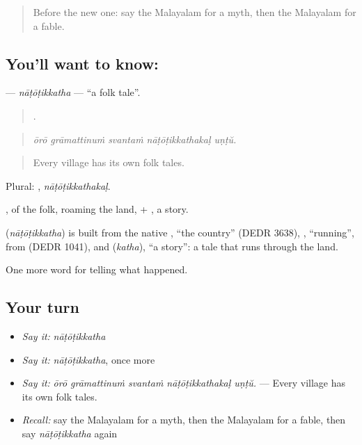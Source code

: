 \label{lesson:ML-C402-natotikkatha}



\begin{quote}
Before the new one: say the Malayalam for a myth, then the Malayalam for a fable.
\end{quote}

\subsection*{You'll want to know: }
\textbf{} — \emph{nāṭōṭikkatha} — \textquotedblleft{}a folk tale\textquotedblright{}.

\begin{quote}
    .
\end{quote}

\begin{quote}
\emph{ōrō grāmattinuṁ svantaṁ nāṭōṭikkathakaḷ uṇṭŭ.}
\end{quote}

\begin{quote}
Every village has its own folk tales.
\end{quote}

Plural: , \emph{nāṭōṭikkathakaḷ}.

, of the folk, roaming the land, + , a story.

\begin{cousinweb}
\textbf{} (\emph{nāṭōṭikkatha}) is built from the native , \textquotedblleft{}the country\textquotedblright{} (DEDR 3638), , \textquotedblleft{}running\textquotedblright{}, from  (DEDR 1041), and  (\emph{katha}), \textquotedblleft{}a story\textquotedblright{}: a tale that runs through the land.
\end{cousinweb}

\begin{grammarlens}[title={What you've built}]
One more word for telling what happened.
\end{grammarlens}

\subsection*{Your turn}
\begin{itemize}
\raggedright
  \item \emph{Say it:} \emph{nāṭōṭikkatha}
  \item \emph{Say it:} \emph{nāṭōṭikkatha}, once more
  \item \emph{Say it:} \emph{ōrō grāmattinuṁ svantaṁ nāṭōṭikkathakaḷ uṇṭŭ.} — Every village has its own folk tales.
  \item \emph{Recall:} say the Malayalam for a myth, then the Malayalam for a fable, then say \emph{nāṭōṭikkatha} again
\end{itemize}

